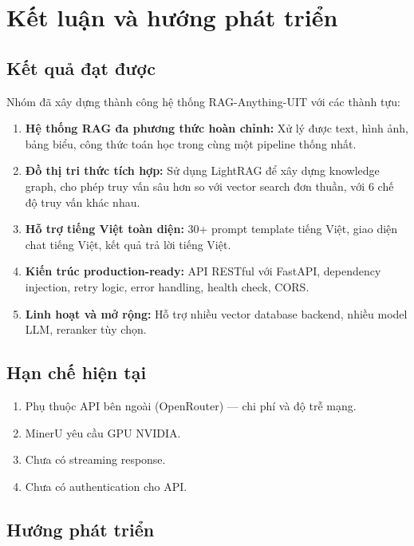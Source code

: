\documentclass[12pt,a4paper]{article}
\begin{document}
\section{Kết luận và hướng phát triển}

\subsection{Kết quả đạt được}

Nhóm đã xây dựng thành công hệ thống RAG-Anything-UIT với các thành tựu:

\begin{enumerate}
  \item \textbf{Hệ thống RAG đa phương thức hoàn chỉnh:} Xử lý được text, hình ảnh, bảng biểu, công thức toán học trong cùng một pipeline thống nhất.
  \item \textbf{Đồ thị tri thức tích hợp:} Sử dụng LightRAG để xây dựng knowledge graph, cho phép truy vấn sâu hơn so với vector search đơn thuần, với 6 chế độ truy vấn khác nhau.
  \item \textbf{Hỗ trợ tiếng Việt toàn diện:} 30+ prompt template tiếng Việt, giao diện chat tiếng Việt, kết quả trả lời tiếng Việt.
  \item \textbf{Kiến trúc production-ready:} API RESTful với FastAPI, dependency injection, retry logic, error handling, health check, CORS.
  \item \textbf{Linh hoạt và mở rộng:} Hỗ trợ nhiều vector database backend, nhiều model LLM, reranker tùy chọn.
\end{enumerate}

\subsection{Hạn chế hiện tại}

\begin{enumerate}
  \item Phụ thuộc API bên ngoài (OpenRouter) --- chi phí và độ trễ mạng.
  \item MinerU yêu cầu GPU NVIDIA.
  \item Chưa có streaming response.
  \item Chưa có authentication cho API.
\end{enumerate}

\subsection{Hướng phát triển}
\end{document}
